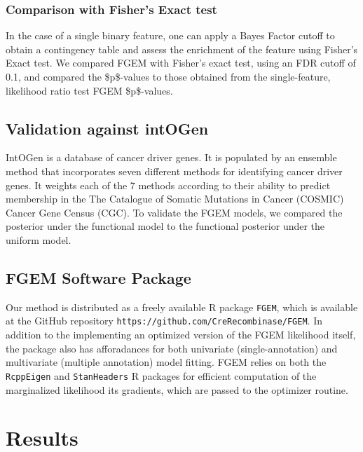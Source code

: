 \subsubsection{Comparison with Fisher's Exact test}\label{sec:orge6f1632}

In the case of a single binary feature, one can apply a Bayes Factor cutoff to obtain a contingency table and assess the enrichment of the feature using Fisher's Exact test.
We compared FGEM with Fisher's exact test, using an FDR cutoff of 0.1, and compared the \$p\$-values to those obtained from the single-feature, likelihood ratio test FGEM \$p\$-values.

\subsection{Validation against intOGen}\label{sec:orgd8b4e10}

IntOGen is a database of cancer driver genes\cite{gonzalez-perez13_intog_mutat_ident_cancer_driver}.  It is populated by an ensemble method that incorporates seven different methods for identifying cancer driver genes.  
It weights each of the 7 methods according to their ability to predict membership in the The Catalogue of Somatic Mutations in Cancer (COSMIC) Cancer Gene Census (CGC)\cite{COSMIC}.
To validate the FGEM models, we compared the posterior under the functional model to the functional posterior under the uniform model.


\subsection{FGEM Software Package}\label{sec:org56b3320}

Our method is distributed as a freely available R package\cite{Rlang} \texttt{FGEM}, which is available at the 
GitHub repository \texttt{https://github.com/CreRecombinase/FGEM}.  In addition to the implementing an optimized version of the FGEM
likelihood itself, the package also has afforadances for both
univariate (single-annotation) and multivariate (multiple annotation) model fitting.  FGEM relies on both the \texttt{RcppEigen}\cite{RcppEigen} and  \texttt{StanHeaders} R
packages for efficient computation of the marginalized likelihood its gradients, which are passed to the optimizer routine.  


\section{Results}\label{sec:org6fb4837}

